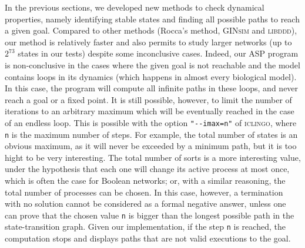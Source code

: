 In the previous sections,
we developed new methods to check dynamical properties,
namely identifying stable states and finding all possible paths to reach a given goal.
Compared to other methods (Rocca's method, \textsc{GINsim} and \textsc{libddd}),
our method is relatively faster and also permits to study larger networks
(up to $2^{73}$ states in our tests) despite some inconclusive cases.
Indeed, our ASP program is non-conclusive in the cases where the given goal is not
reachable and the model contains loops in its dynamics
(which happens in almost every biological model).
In this case, the program will compute all infinite paths in these loops,
and never reach a goal or a fixed point.
It is still possible, however, to limit the number of iterations to an arbitrary
maximum which will be eventually reached in the case of an endless loop.
This is possible with the option \texttt{"-{}-imax=n"} of \textsc{iclingo},
where \texttt{n} is the maximum number of steps.
For example, the total number of states is an obvious maximum,
as it will never be exceeded by a minimum path,
but it is too hight to be very interesting.
The total number of sorts is a more interesting value,
under the hypothesis that each one will change its active process at most once,
which is often the case for Boolean networks;
or, with a similar reasoning, the total number of processes can be chosen.
In this case, however, a termination with no solution cannot be considered as a formal
negative answer, unless one can prove that the chosen value \texttt{n}
is bigger than the longest possible path in the state-transition graph.
Given our implementation, if the step \texttt{n} is reached,
the computation stops and displays paths that are not valid executions
to the goal.
